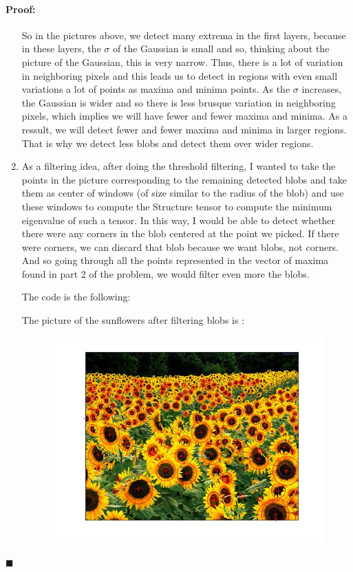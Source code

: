 \documentclass[12pt]{article}
\newenvironment{proof}{\paragraph{Proof: }}{\hfill$\blacksquare$}
\begin{document}
\begin{proof}
\begin{enumerate}
So in the pictures above, we detect many extrema in the first layers, because in these layers, the $\sigma$ of the Gaussian is small and so, thinking about the picture of the Gaussian, this is very narrow. Thus, there is a lot of variation in neighboring pixels and this leads us to detect in regions with even small variations a lot of points as maxima and minima points. As the $\sigma$ increases, the Gaussian is wider and so there is less brusque variation in neighboring pixels, which implies we will have fewer and fewer maxima and minima. As a ressult, we will detect fewer and fewer maxima and minima in larger regions. That is why we detect less blobs and detect them over wider regions. 


\item As a filtering idea, after doing the threshold filtering, I wanted to take the points in the picture corresponding to the remaining detected blobs and take them as center of windows (of size similar to the radius of the blob) and use these windows to compute the Structure tensor to compute the minimum eigenvalue of such a tensor. In this way, I would be able to detect whether there were any corners in the blob centered at the point we picked. If there were corners, we can discard that blob because we want blobs, not corners. And so going through all the points represented in the vector of maxima found in part 2 of the problem, we would filter even more the blobs.

The code is the following:




The picture of the sunflowers after filtering blobs is :

\begin{figure}[H]
\begin{center}
\advance\leftskip-3cm
\advance\rightskip-3cm
\includegraphics[keepaspectratio=true, scale = 0.8]{filtered_sunflower.jpg}
\caption{}
\label{Fltered sunflowers}
\end{center}
\end{figure}


\end{enumerate}
\end{proof}
\end{document}
